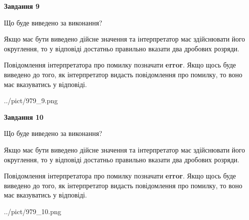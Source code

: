 \documentclass[12pt, ukrainian]{article}
\begin{document}
{\begin {Large}
{\begin {center}\textbf{Завдання 9}\end {center}}\par
Що буде виведено за виконання? \par

Якщо має бути виведено дійсне значення та інтерпретатор має здійснювати його округлення, 
то у відповіді достатньо правильно вказати два дробових розряди.

Повідомлення інтерпретатора про помилку позначати \textbf{error}.
Якщо щось буде виведено до того, як інтерпретатор видасть повідомлення про помилку, 
то воно має вказуватись у відповіді. \par

\begin{center}
	{../pict/979_9.png}
\end{center}
\newpage

{\begin {center}\textbf{Завдання 10}\end {center}}\par
Що буде виведено за виконання? \par

Якщо має бути виведено дійсне значення та інтерпретатор має здійснювати його округлення, 
то у відповіді достатньо правильно вказати два дробових розряди.

Повідомлення інтерпретатора про помилку позначати \textbf{error}.
Якщо щось буде виведено до того, як інтерпретатор видасть повідомлення про помилку, 
то воно має вказуватись у відповіді. \par

\begin{center}
	{../pict/979_10.png}
\end{center}
\newpage

\end {Large}}
\end{document}
